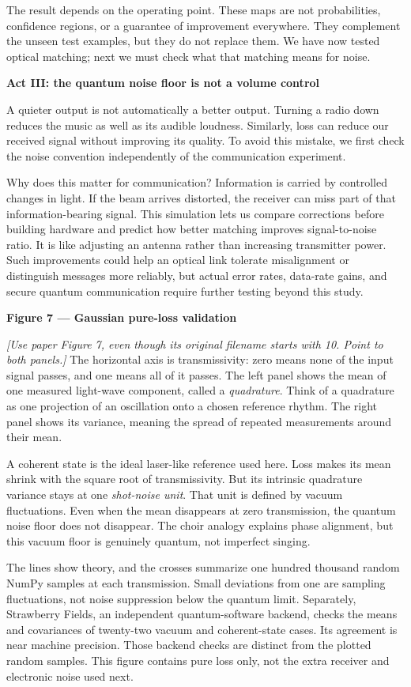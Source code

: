 \documentclass[11pt,letterpaper]{article}
\newcommand{\cue}[1]{\par\textbf{#1}\par}
\newcommand{\stage}[1]{\textit{[#1]}}
\begin{document}
The result depends on the operating point. These maps are not probabilities, confidence regions, or a guarantee of improvement everywhere. They complement the unseen test examples, but they do not replace them. We have now tested optical matching; next we must check what that matching means for noise.

\newpage
\cue{Act III: the quantum noise floor is not a volume control}
A quieter output is not automatically a better output. Turning a radio down reduces the music as well as its audible loudness. Similarly, loss can reduce our received signal without improving its quality. To avoid this mistake, we first check the noise convention independently of the communication experiment.

Why does this matter for communication? Information is carried by controlled changes in light. If the beam arrives distorted, the receiver can miss part of that information-bearing signal. This simulation lets us compare corrections before building hardware and predict how better matching improves signal-to-noise ratio. It is like adjusting an antenna rather than increasing transmitter power. Such improvements could help an optical link tolerate misalignment or distinguish messages more reliably, but actual error rates, data-rate gains, and secure quantum communication require further testing beyond this study.

\cue{Figure 7 --- Gaussian pure-loss validation}
\stage{Use paper Figure 7, even though its original filename starts with 10. Point to both panels.}
The horizontal axis is transmissivity: zero means none of the input signal passes, and one means all of it passes. The left panel shows the mean of one measured light-wave component, called a \emph{quadrature}. Think of a quadrature as one projection of an oscillation onto a chosen reference rhythm. The right panel shows its variance, meaning the spread of repeated measurements around their mean.

A coherent state is the ideal laser-like reference used here. Loss makes its mean shrink with the square root of transmissivity. But its intrinsic quadrature variance stays at one \emph{shot-noise unit}. That unit is defined by vacuum fluctuations. Even when the mean disappears at zero transmission, the quantum noise floor does not disappear. The choir analogy explains phase alignment, but this vacuum floor is genuinely quantum, not imperfect singing.

The lines show theory, and the crosses summarize one hundred thousand random NumPy samples at each transmission. Small deviations from one are sampling fluctuations, not noise suppression below the quantum limit. Separately, Strawberry Fields, an independent quantum-software backend, checks the means and covariances of twenty-two vacuum and coherent-state cases. Its agreement is near machine precision. Those backend checks are distinct from the plotted random samples. This figure contains pure loss only, not the extra receiver and electronic noise used next.
\end{document}
